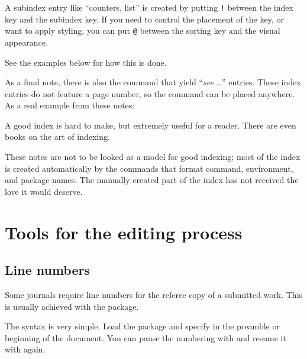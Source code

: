 A subindex entry like ``counters, list''
is created by putting \verb|!| between the index key and the subindex key.
If you need to control the placement of the key,
or want to apply styling,
you can put \verb|@| between the sorting key and the visual appearance.

See the examples below for how this is done.
\begin{ExampleCode}
\end{ExampleCode}

As a final note, there is also the  command
that yield ``\emph{see} \dots'' entries.
These index entries do not feature a page number,
so the command can be placed anywhere.
As a real example from these notes:
\begin{ExampleCode}
\end{ExampleCode}


\begin{practices}
A good index is hard to make, but extremely useful for a reader.
There are even books on the art of indexing.

These notes are not to be looked as a model for good indexing;
most of the index is created automatically by the commands
that format command, environment, and package names.
The manually created part of the index has not received the love it would deserve.
\end{practices}



%
%
%
\section{Tools for the editing process}

%
\subsection{Line numbers}

Some journals require line numbers for the referee copy of a submitted work.
This is usually achieved with the  package.

The syntax is very simple.
Load the package and specify  in the preamble or beginning of the document.
You can pause the numbering with  and resume it with  again.

